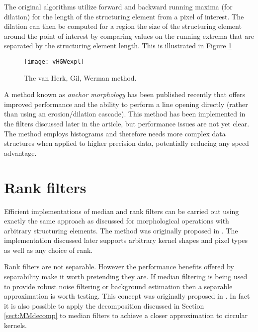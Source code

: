 \documentclass{InsightArticle}
\begin{document}
The original algorithms utilize forward and backward running maxima
(for dilation) for the length of the structuring element from a pixel
of interest. The dilation can then be computed for a region the size
of the structuring element around the point of interest by comparing
values on the running extrema that are separated by the structuring
element length. This is illustrated in Figure \ref{fig:vHGWmethod}

\begin{figure}[htbp]
\centering
\texttt{[image: vHGWexpl]}
\caption{The van Herk, Gil, Werman method.\label{fig:vHGWmethod}}
\end{figure}

A method known as {\em anchor morphology} has been published recently
\cite{Vandroogenbroeck2005Morphological} that offers improved
performance and the ability to perform a line opening directly (rather
than using an erosion/dilation cascade). This method has been
implemented in the filters discussed later in the article, but
performance issues are not yet clear. The method employs histograms
and therefore needs more complex data structures when applied to
higher precision data, potentially reducing any speed advantage.

\section{Rank filters}
\label{sect:rank}
Efficient implementations of median and rank filters can be carried out
using exactly the same approach as discussed for morphological
operations with arbitrary structuring elements. The method was
originally proposed in \cite{Huang79}. The implementation discussed
later supports arbitrary kernel shapes and pixel types as well as any
choice of rank.

Rank filters are not separable. However the performance benefits
offered by separability make it worth pretending they are. If median
filtering is being used to provide robust noise filtering or
background estimation then a separable approximation is worth
testing. This concept was originally proposed in \cite{Narendra81}. In
fact it is also possible to apply the decomposition discussed in
Section \ref{sect:MMdecomp} to median filters to achieve a closer
approximation to circular kernels.
\end{document}
